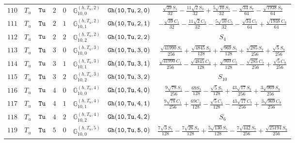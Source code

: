 \documentclass[fleqn,8pt]{jsarticle}
\begin{document}
\begin{table}[ht!]
\begin{center}
\begin{tabular}{cccccccc}
$ 110 $ & $ T_{u} $ & $ {\tt Tu} $ & $ 2 $ & $ 0 $ & $ \mathbb{G}_{10,0}^{(h,T_{u},2)} $ & $ {\tt Gh(10,Tu,2,0)} $ & $ \frac{\sqrt{39} S_{1}}{32} - \frac{11 \sqrt{2} S_{3}}{32} + \frac{5 \sqrt{10} S_{5}}{32} - \frac{\sqrt{34} S_{7}}{64} - \frac{\sqrt{1938} S_{9}}{64} $ \\
$ 111 $ & $ T_{u} $ & $ {\tt Tu} $ & $ 2 $ & $ 1 $ & $ \mathbb{G}_{10,1}^{(h,T_{u},2)} $ & $ {\tt Gh(10,Tu,2,1)} $ & $ - \frac{\sqrt{39} C_{1}}{32} - \frac{11 \sqrt{2} C_{3}}{32} - \frac{5 \sqrt{10} C_{5}}{32} - \frac{\sqrt{34} C_{7}}{64} + \frac{\sqrt{1938} C_{9}}{64} $ \\
$ 112 $ & $ T_{u} $ & $ {\tt Tu} $ & $ 2 $ & $ 2 $ & $ \mathbb{G}_{10,2}^{(h,T_{u},2)} $ & $ {\tt Gh(10,Tu,2,2)} $ & $ S_{4} $ \\
$ 113 $ & $ T_{u} $ & $ {\tt Tu} $ & $ 3 $ & $ 0 $ & $ \mathbb{G}_{10,0}^{(h,T_{u},3)} $ & $ {\tt Gh(10,Tu,3,0)} $ & $ \frac{\sqrt{41990} S_{1}}{256} + \frac{\sqrt{4845} S_{3}}{128} + \frac{\sqrt{969} S_{5}}{128} + \frac{\sqrt{285} S_{7}}{256} + \frac{\sqrt{5} S_{9}}{256} $ \\
$ 114 $ & $ T_{u} $ & $ {\tt Tu} $ & $ 3 $ & $ 1 $ & $ \mathbb{G}_{10,1}^{(h,T_{u},3)} $ & $ {\tt Gh(10,Tu,3,1)} $ & $ \frac{\sqrt{41990} C_{1}}{256} - \frac{\sqrt{4845} C_{3}}{128} + \frac{\sqrt{969} C_{5}}{128} - \frac{\sqrt{285} C_{7}}{256} + \frac{\sqrt{5} C_{9}}{256} $ \\
$ 115 $ & $ T_{u} $ & $ {\tt Tu} $ & $ 3 $ & $ 2 $ & $ \mathbb{G}_{10,2}^{(h,T_{u},3)} $ & $ {\tt Gh(10,Tu,3,2)} $ & $ S_{10} $ \\
$ 116 $ & $ T_{u} $ & $ {\tt Tu} $ & $ 4 $ & $ 0 $ & $ \mathbb{G}_{10,0}^{(h,T_{u},4)} $ & $ {\tt Gh(10,Tu,4,0)} $ & $ \frac{9 \sqrt{78} S_{1}}{256} - \frac{69 S_{3}}{128} - \frac{\sqrt{5} S_{5}}{128} + \frac{43 \sqrt{17} S_{7}}{256} + \frac{3 \sqrt{969} S_{9}}{256} $ \\
$ 117 $ & $ T_{u} $ & $ {\tt Tu} $ & $ 4 $ & $ 1 $ & $ \mathbb{G}_{10,1}^{(h,T_{u},4)} $ & $ {\tt Gh(10,Tu,4,1)} $ & $ \frac{9 \sqrt{78} C_{1}}{256} + \frac{69 C_{3}}{128} - \frac{\sqrt{5} C_{5}}{128} - \frac{43 \sqrt{17} C_{7}}{256} + \frac{3 \sqrt{969} C_{9}}{256} $ \\
$ 118 $ & $ T_{u} $ & $ {\tt Tu} $ & $ 4 $ & $ 2 $ & $ \mathbb{G}_{10,2}^{(h,T_{u},4)} $ & $ {\tt Gh(10,Tu,4,2)} $ & $ S_{6} $ \\
$ 119 $ & $ T_{u} $ & $ {\tt Tu} $ & $ 5 $ & $ 0 $ & $ \mathbb{G}_{10,0}^{(h,T_{u},5)} $ & $ {\tt Gh(10,Tu,5,0)} $ & $ \frac{7 \sqrt{3} S_{1}}{128} - \frac{7 \sqrt{26} S_{3}}{128} + \frac{5 \sqrt{130} S_{5}}{128} - \frac{7 \sqrt{442} S_{7}}{256} + \frac{\sqrt{25194} S_{9}}{256} $ \\

\end{tabular}
\end{center}
\end{table}
\end{document}
